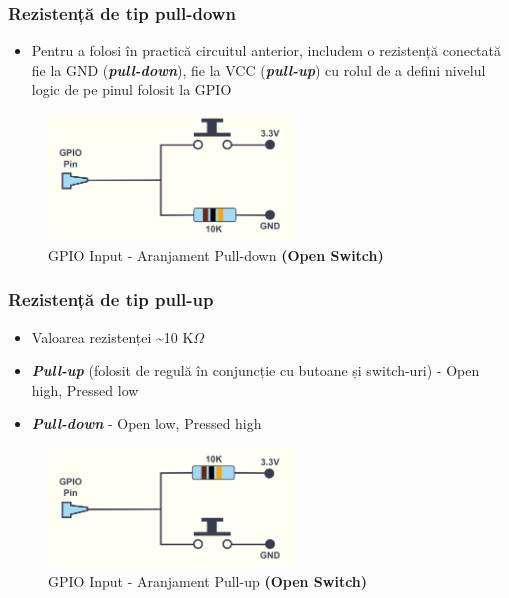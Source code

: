 \documentclass[xcolor={table}]{beamer}
\begin{document}
    \begin{frame}
	    \frametitle{Rezistență de tip pull-down}
	    \begin{itemize}
	        \item Pentru a folosi în practică circuitul anterior, includem o rezistență conectată fie la GND (\textbf{\textit{pull-down}}), fie la VCC (\textbf{\textit{pull-up}}) cu rolul de a defini nivelul logic de pe pinul folosit la GPIO
	    \end{itemize}
	    \begin{figure}
	        \centering
	        \includegraphics[width=6.5cm]{images/gpio3-pulldown.png}
	        \caption{GPIO Input - Aranjament Pull-down \textbf{(Open Switch)}}
	        \label{fig:my_label}
	    \end{figure}
	\end{frame}
	    \begin{frame}
	    \frametitle{Rezistență de tip pull-up}
	    \begin{itemize}
	        \item Valoarea rezistenței \sim 10 K$\Omega$	  \item \textbf{\textit{Pull-up}} (folosit de regulă în conjuncție cu butoane și switch-uri) - Open high, Pressed low
	        \item \textbf{\textit{Pull-down}} - Open low, Pressed high
	    \end{itemize}
	    \begin{figure}
	        \centering
	        \includegraphics[width=6.5cm]{images/gpio4-pullup.png}
	        \caption{GPIO Input - Aranjament Pull-up \textbf{(Open Switch)}}
	        \label{fig:my_label}
	    \end{figure}
	\end{frame}
\end{document}
